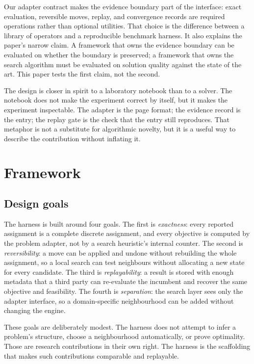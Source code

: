 \documentclass[11pt]{article}
\begin{document}
Our adapter contract makes the evidence boundary part of the interface: exact evaluation, reversible
moves, replay, and convergence records are required operations rather than optional utilities. That
choice is the difference between a library of operators and a reproducible benchmark harness. It also
explains the paper's narrow claim. A framework that owns the evidence boundary can be evaluated on
whether the boundary is preserved; a framework that owns the search algorithm must be evaluated on
solution quality against the state of the art. This paper tests the first claim, not the second.

The design is closer in spirit to a laboratory notebook than to a solver. The notebook does not make
the experiment correct by itself, but it makes the experiment inspectable. The adapter is the page
format; the evidence record is the entry; the replay gate is the check that the entry still
reproduces. That metaphor is not a substitute for algorithmic novelty, but it is a useful way to
describe the contribution without inflating it.

\section{Framework}
\label{sec:framework}

\subsection{Design goals}

The harness is built around four goals. The first is \emph{exactness}: every reported assignment is a
complete discrete assignment, and every objective is computed by the problem adapter, not by a search
heuristic's internal counter. The second is \emph{reversibility}: a move can be applied and undone
without rebuilding the whole assignment, so a local search can test neighbours without allocating a
new state for every candidate. The third is \emph{replayability}: a result is stored with enough
metadata that a third party can re-evaluate the incumbent and recover the same objective and
feasibility. The fourth is \emph{separation}: the search layer sees only the adapter interface, so a
domain-specific neighbourhood can be added without changing the engine.

These goals are deliberately modest. The harness does not attempt to infer a problem's structure,
choose a neighbourhood automatically, or prove optimality. Those are research contributions in their
own right. The harness is the scaffolding that makes such contributions comparable and replayable.
\end{document}
